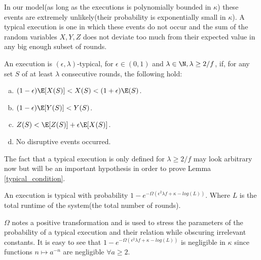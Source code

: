 \documentclass[..]{subfiles}
\begin{document}
In our model(as long as the executions is polynomially bounded in $\kappa$) these events are extremely unlikely(their probability is exponentially small in $\kappa$). A typical execution is one in which these events do not occur and the sum of the random variables $X, Y, Z$ does not deviate too much from their expected value in any big enough subset of rounds.

\begin{definition}
	An execution is $(\epsilon, \lambda)$-typical, for $\epsilon \in (0,1)$ and $\lambda \in \N, \lambda \ge 2/f$, if, for any set $S$ of at least $\lambda$ consecutive rounds, the following hold:
	\begin{enumerate}[(a)]
		\item $(1 - \epsilon)\E[X(S)] < X(S) < (1 + \epsilon)\E(S)$.
		\item $(1 - \epsilon)\E[Y(S)] < Y(S)$.
		\item $Z(S) < \E[Z(S)] + \epsilon \E[X(S)]$.
		\item No disruptive events occurred.
	\end{enumerate}
\end{definition}

\begin{remark}
	The fact that a typical execution is only defined for $\lambda \ge 2/f$ may look arbitrary now but will be an important hypothesis in order to prove Lemma \ref{typical_condition}.
\end{remark}

\begin{theorem}
	An execution is typical with probability $1-e^{-\Omega(\epsilon ^2 \lambda f + \kappa - log(L))}$. Where $L$ is the total runtime of the system(the total number of rounds).
\end{theorem}

\begin{remark}
	\normalfont
	$\Omega$ notes a positive transformation and is used to stress the parameters of the probability of a typical execution and their relation while obscuring irrelevant constants. It is easy to see that $1-e^{-\Omega(\epsilon ^2 \lambda f + \kappa - log(L))}$ is negligible in $\kappa$ since functions $n \mapsto a^{-n}$  are negligible $\forall a \ge 2$.
\end{remark}
\end{document}
